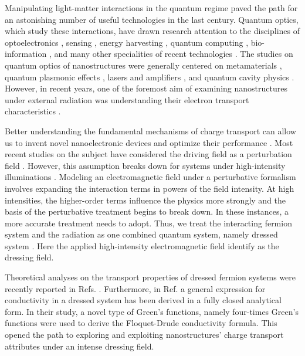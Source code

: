 
Manipulating light-matter interactions in the quantum regime paved the path for an astonishing number of useful technologies in the last century. Quantum optics, which study these interactions, have drawn research attention to the disciplines of optoelectronics \cite{liu16,wijesekara20,tao21,wijesekara21}, sensing \cite{rodrigo2015,pirandola18,hapuarachchi2018}, energy harvesting \cite{yuan16,sun18},
quantum computing \cite{huh15,slussarenko19,andersen21}, bio-information \cite{marais18,bian20}, and many other specialities of recent technologies \cite{rivera20}.
The studies on quantum optics of nanostructures were generally centered on metamaterials \cite{shalaev07,si14}, quantum plasmonic effects \cite{hapuarachchi19,perera20}, lasers and amplifiers \cite{zhang05,chow13}, and quantum cavity physics \cite{tsang10,devi20}.
However, in recent years, one of the foremost aim of examining nanostructures under external radiation was understanding their electron transport characteristics \cite{kitagawa11,zhou11,kibis14,pervishko15,morina15,dehghani15,dini16,wackerl20}.

Better understanding the fundamental mechanisms of charge transport can allow us to invent novel nanoelectronic devices and optimize their performance \cite{premaratne21}.
Most recent studies on the subject have considered the driving field as a perturbation field \cite{pervishko15,morina15}. However, this assumption breaks down for systems under high-intensity illuminations \cite{grifoni98,wackerl20}.
Modeling an electromagnetic field under a perturbative formalism involves expanding the interaction terms in powers of the field intensity. At high intensities, the higher-order terms influence the physics more strongly and the basis of the perturbative treatment begins to break down.
In these instances, a more accurate treatment needs to adopt. Thus, we treat the interacting fermion system and the radiation as one combined quantum system, namely dressed system \cite{morina15,cohen98,scully01}. Here the applied high-intensity  electromagnetic field identify as the dressing field.

Theoretical analyses on the transport properties of dressed fermion systems were recently reported in Refs. \cite{kibis14,morina15,wackerl20}.
Furthermore, in Ref. \cite{wackerl20} a general expression for conductivity in a dressed system has been derived in a fully closed analytical form. In their study, a novel type of Green’s functions, namely four-times Green’s functions were used to derive the Floquet-Drude conductivity formula. This opened the path to exploring and exploiting nanostructures' charge transport attributes under an intense dressing field.

